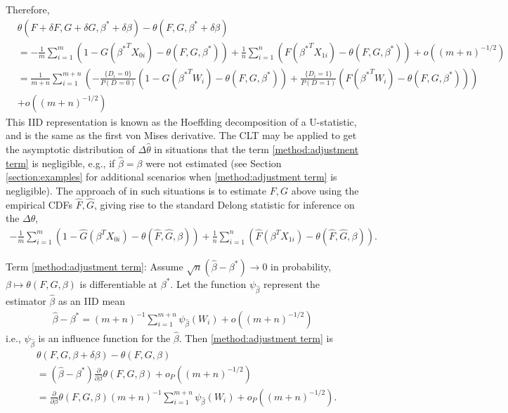 \documentclass[12pt]{article}
\renewcommand{\P}{P}
\newcommand{\X}[1][]{X_{0#1}}
\newcommand{\Y}[1][]{X_{1#1}}
\newcommand{\W}[1][]{W_{#1}}
\newcommand{\D}[1][]{D_{#1}}
\renewcommand{\t}[1]{{#1}^T}
\renewcommand{\star}[1]{{#1}^\ast}
\newcommand{\infl}[1][]{\psi_{#1}}
\newcommand{\F}{F}
\newcommand{\G}{G}
\newcommand{\m}{m}
\newcommand{\n}{n}
\newcommand{\N}{m+n}
\newcommand{\auc}{\theta}
\newcommand{\aucdiff}{\Delta\auc}
\newcommand{\aucdiffhat}{\Delta\hat{\auc}}
\theoremstyle{definition}
\begin{document}
Therefore,
\begin{align}
  &\auc(\F+\delta\F,\G+\delta\G,\star\beta+\delta\beta) - \auc(\F,\G,\star\beta+\delta\beta) \\%
  &=-\frac{1}{\m}\sum_{i=1}^\m(1-\G(\t{\star\beta}\X[i])-\auc(\F,\G,\star\beta)) + \frac{1}{\n}\sum_{i=1}^\n(\F(\t{\star\beta}\Y[i])-\auc(\F,\G,\star\beta))+ o((\N)^{-1/2})\\
    &=\frac{1}{\N}\sum_{i=1}^{\N}\left(-\frac{\{\D[i]=0\}}{\P(\D=0)}(1-\G(\t{\star\beta}\W[i])-\auc(\F,\G,\star\beta)) + \frac{\{\D[i]=1\}}{\P(\D=1)}(\F(\t{\star\beta}\W[i])-\auc(\F,\G,\star\beta))\right)\\
  &+ o((\N)^{-1/2}) \label{method:hoeffding}
\end{align}
This IID representation is known as the
Hoeffding decomposition of a U-statistic, and is the same as the first
von Mises derivative. %
The CLT may be applied to get the asymptotic distribution of
$\aucdiffhat$ in situations that the term \eqref{method:adjustment term} is
negligible, e.g., if $\hat\beta=\beta$ were not estimated (see Section \ref{section:examples}
for additional scenarios when \eqref{method:adjustment term} is
negligible). The approach of \citet{delong1988} in such situations is to estimate
$\F,\G$ above using the empirical CDFs $\hat\F,\hat\G$,
giving rise to the standard Delong statistic for inference on the
$\aucdiff$,
\begin{align}
  -\frac{1}{\m}\sum_{i=1}^\m(1-\hat\G(\t{\beta}\X[i])-\auc(\hat\F,\hat\G,\beta)) + \frac{1}{\n}\sum_{i=1}^\n(\hat\F(\t{\beta}\Y[i])-\auc(\hat\F,\hat\G,\beta)).
\end{align}



Term \eqref{method:adjustment term}: Assume
$\sqrt{n}(\hat\beta-\star\beta)\to 0$ in probability,
$\beta\mapsto\auc(\F,\G,\beta)$ is differentiable at $\star\beta$. Let
the function $\infl[\hat\beta]$ represent the estimator $\hat\beta$ as
an IID mean
\begin{align}
  \hat\beta-\star\beta=(\N)^{-1}\sum_{i=1}^{\m+\n}\infl[\hat\beta](\W[i]) + o((\N)^{-1/2})
\end{align}
i.e., $\infl[\hat\beta]$ is an influence function for the $\hat\beta$. Then \eqref{method:adjustment term} is
\begin{align}
  &\auc(\F,\G,\beta+\delta\beta)-\auc(\F,\G,\beta)  \\
  &=(\hat\beta-\star\beta)\frac{\partial}{\partial\beta}\auc(\F,\G,\beta) + o_P((\N)^{-1/2})\\
  &=\frac{\partial}{\partial\beta}\auc(\F,\G,\beta)(\N)^{-1}\sum_{i=1}^{\m+\n}\infl[\hat\beta](\W[i]) + o_P((\N)^{-1/2}).
\end{align}
\end{document}
